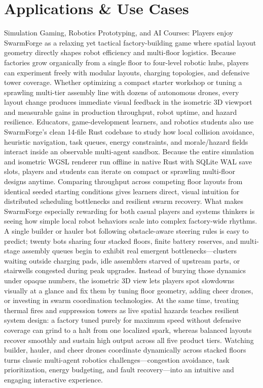 \documentclass[10pt,letterpaper]{article}
\begin{document}
\section{Applications \& Use Cases}
Simulation Gaming, Robotics Prototyping, and AI Courses: Players enjoy SwarmForge as a relaxing yet tactical factory-building game where spatial layout geometry directly shapes robot efficiency and multi-floor logistics. Because factories grow organically from a single floor to four-level robotic hubs, players can experiment freely with modular layouts, charging topologies, and defensive tower coverage. Whether optimizing a compact starter workshop or tuning a sprawling multi-tier assembly line with dozens of autonomous drones, every layout change produces immediate visual feedback in the isometric 3D viewport and measurable gains in production throughput, robot uptime, and hazard resilience. Educators, game-development learners, and robotics students also use SwarmForge's clean 14-file Rust codebase to study how local collision avoidance, heuristic navigation, task queues, energy constraints, and morale/hazard fields interact inside an observable multi-agent sandbox. Because the entire simulation and isometric WGSL renderer run offline in native Rust with SQLite WAL save slots, players and students can iterate on compact or sprawling multi-floor designs anytime. Comparing throughput across competing floor layouts from identical seeded starting conditions gives learners direct, visual intuition for distributed scheduling bottlenecks and resilient swarm recovery. What makes SwarmForge especially rewarding for both casual players and systems thinkers is seeing how simple local robot behaviors scale into complex factory-wide rhythms. A single builder or hauler bot following obstacle-aware steering rules is easy to predict; twenty bots sharing four stacked floors, finite battery reserves, and multi-stage assembly queues begin to exhibit real emergent bottlenecks---clusters waiting outside charging pads, idle assemblers starved of upstream parts, or stairwells congested during peak upgrades. Instead of burying those dynamics under opaque numbers, the isometric 3D view lets players spot slowdowns visually at a glance and fix them by tuning floor geometry, adding cheer drones, or investing in swarm coordination technologies. At the same time, treating thermal fires and suppression towers as live spatial hazards teaches resilient system design: a factory tuned purely for maximum speed without defensive coverage can grind to a halt from one localized spark, whereas balanced layouts recover smoothly and sustain high output across all five product tiers. Watching builder, hauler, and cheer drones coordinate dynamically across stacked floors turns classic multi-agent robotics challenges---congestion avoidance, task prioritization, energy budgeting, and fault recovery---into an intuitive and engaging interactive experience.
\end{document}
